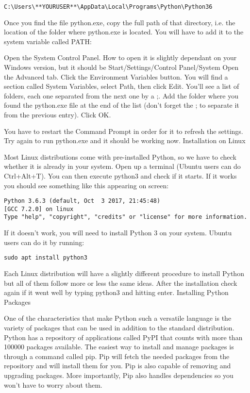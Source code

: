\begin{verbatim}
C:\Users\**YOURUSER**\AppData\Local\Programs\Python\Python36
\end{verbatim}

Once you find the file python.exe, copy the full path of that directory, i.e. the location of the folder where python.exe is located. You will have to add it to the system variable called PATH:

    Open the System Control Panel. How to open it is slightly dependant on your Windows version, but it should be Start/Settings/Control Panel/System
    Open the Advanced tab.
    Click the Environment Variables button.
    You will find a section called System Variables, select Path, then click Edit. You’ll see a list of folders, each one separated from the next one by a ;.
    Add the folder where you found the python.exe file at the end of the list (don’t forget the ; to separate it from the previous entry). Click OK.

You have to restart the Command Prompt in order for it to refresh the settings. Try again to run python.exe and it should be working now.
Installation on Linux

Most Linux distributions come with pre-installed Python, so we have to check whether it is already in your system. Open up a terminal (Ubuntu users can do Ctrl+Alt+T). You can then execute python3 and check if it starts. If it works you should see something like this appearing on screen:

\begin{verbatim}
Python 3.6.3 (default, Oct  3 2017, 21:45:48)
[GCC 7.2.0] on linux
Type "help", "copyright", "credits" or "license" for more information.
\end{verbatim}

If it doesn’t work, you will need to install Python 3 on your system. Ubuntu users can do it by running:
\begin{verbatim}
sudo apt install python3
\end{verbatim}

Each Linux distribution will have a slightly different procedure to install Python but all of them follow more or less the same ideas. After the installation check again if it went well by typing python3 and hitting enter.
Installing Python Packages

One of the characteristics that make Python such a versatile language is the variety of packages that can be used in addition to the standard distribution. Python has a repository of applications called PyPI that counts with more than 100000 packages available. The easiest way to install and manage packages is through a command called pip. Pip will fetch the needed packages from the repository and will install them for you. Pip is also capable of removing and upgrading packages. More importantly, Pip also handles dependencies so you won’t have to worry about them.

